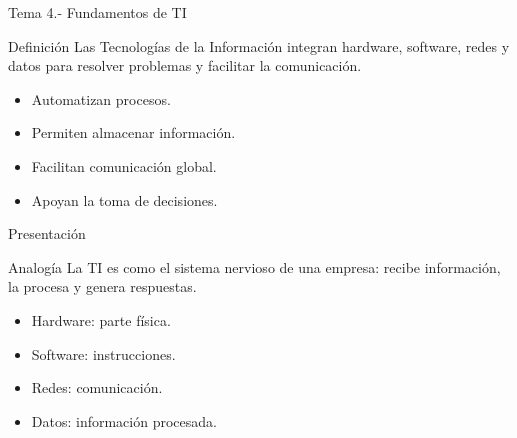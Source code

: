 \documentclass[10pt, aspectratio=169]{beamer}
\begin{document}
	\begin{frame}{Tema 4.- Fundamentos de TI}
		
		\begin{block}{Definición}
			Las Tecnologías de la Información integran hardware, software, redes y datos para resolver problemas y facilitar la comunicación.
		\end{block}
		
		\begin{itemize}
			\item Automatizan procesos.
			\item Permiten almacenar información.
			\item Facilitan comunicación global.
			\item Apoyan la toma de decisiones.
		\end{itemize}
		
	\end{frame}
	
	\begin{frame}{Presentación}
		
		\begin{block}{Analogía}
			La TI es como el sistema nervioso de una empresa: recibe información, la procesa y genera respuestas.
		\end{block}
		
		\begin{itemize}
			\item Hardware: parte física.
			\item Software: instrucciones.
			\item Redes: comunicación.
			\item Datos: información procesada.
		\end{itemize}
		
	\end{frame}
	
\end{document}
